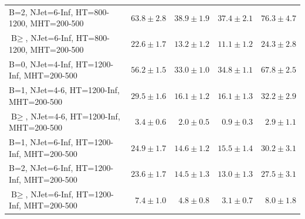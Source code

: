 \documentclass{beamer}
\begin{document}
\begin{frame}
\begin{tabular}{lrrrr}
   B=2, NJet=6-Inf, HT=800-1200, MHT=200-500 &              $63.8\pm2.8$&              $38.9\pm1.9$&              $37.4\pm2.1$&                  $76.3\pm4.7$ \\ 
   $\text{B}\geq$, NJet=6-Inf, HT=800-1200, MHT=200-500 &              $22.6\pm1.7$&              $13.2\pm1.2$&              $11.1\pm1.2$&                  $24.3\pm2.8$ \\ 
   B=0, NJet=4-Inf, HT=1200-Inf, MHT=200-500 &              $56.2\pm1.5$&              $33.0\pm1.0$&              $34.8\pm1.1$&                  $67.8\pm2.5$ \\ 
     B=1, NJet=4-6, HT=1200-Inf, MHT=200-500 &              $29.5\pm1.6$&              $16.1\pm1.2$&              $16.1\pm1.3$&                  $32.2\pm2.9$ \\ 
     $\text{B}\geq$, NJet=4-6, HT=1200-Inf, MHT=200-500 &               $3.4\pm0.6$&               $2.0\pm0.5$&               $0.9\pm0.3$&                   $2.9\pm1.1$ \\ 
   B=1, NJet=6-Inf, HT=1200-Inf, MHT=200-500 &              $24.9\pm1.7$&              $14.6\pm1.2$&              $15.5\pm1.4$&                  $30.2\pm3.1$ \\ 
   B=2, NJet=6-Inf, HT=1200-Inf, MHT=200-500 &              $23.6\pm1.7$&              $14.5\pm1.3$&              $13.0\pm1.3$&                  $27.5\pm3.1$ \\ 
   $\text{B}\geq$, NJet=6-Inf, HT=1200-Inf, MHT=200-500 &               $7.4\pm1.0$&               $4.8\pm0.8$&               $3.1\pm0.7$&                   $8.0\pm1.8$ \\ 
\bottomrule 
\end{tabular}

\end{frame}
\end{document}
